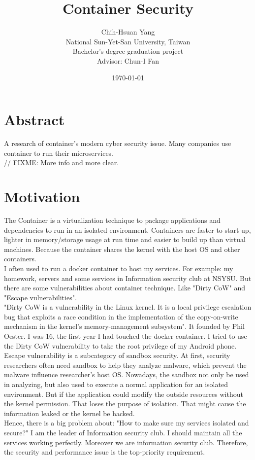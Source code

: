 \documentclass[12pt,a4paper,oneside,draft]{IEEEconf}
\title{{\mytitle Container Security}}
\author{Chih-Hsuan Yang\\

National Sun-Yet-San University, Taiwan \\
Bachelor's degree graduation project \\

Advisor: Chun-I Fan
}
\date{\today}
\begin{document}
\maketitle


\section{Abstract}
A research of container's modern cyber security issue.
Many companies use container to run their microservices.\\
// FIXME: More info and more clear.

\section{Motivation}
The Container is a virtualization technique to package applications and dependencies to run in
an isolated environment. Containers are faster to start-up, lighter in memory/storage usage
at run time and easier to build up than virtual machines. Because the container shares the
kernel with the host OS and other containers.\\
I often used to run a docker container to host my services. For example: my homework,
servers and some services in Information security club at NSYSU.
But there are some vulnerabilities about container technique. Like "Dirty CoW\cite{Dirty_CoW}"
and "Escape vulnerabilities".\\
"Dirty CoW is a vulnerability in the Linux kernel. It is a local privilege escalation bug
that exploits a race condition in the implementation of the copy-on-write mechanism in the
kernel's memory-management subsystem"\cite{Dirty_CoW_wiki}. It founded by Phil Oester. I
was 16, the first year I had touched the docker container. I tried to use the Dirty CoW
vulnerability to take the root privilege of my Android phone.\\
Escape vulnerability is a subcategory of sandbox security. At first, security researchers often
need sandbox to help they analyze malware, which prevent the malware influence researcher's
host OS. Nowadays, the sandbox not only be used in analyzing, but also used to execute a
normal application for an isolated environment. But if the application could modify the
outside resources without the kernel permission. That loses the purpose of isolation. That
might cause the information leaked or the kernel be hacked.\\
Hence, there is a big problem about: "How to make sure my services isolated and secure?" I
am the leader of Information security club. I should maintain all the services working
perfectly. Moreover we are information security club. Therefore, the security and performance
issue is the top-priority requirement.\\
\end{document}
